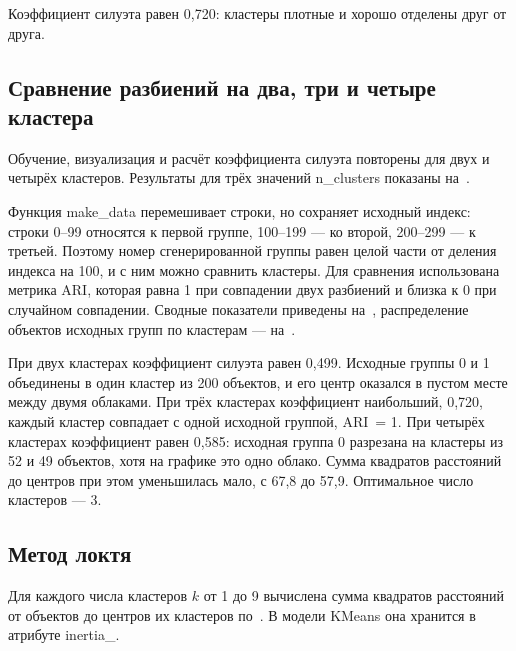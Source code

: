 \documentclass[a4paper,14pt]{extarticle}
\begin{document}

Коэффициент силуэта равен 0,720: кластеры плотные и хорошо отделены друг от друга.

\subsection{Сравнение разбиений на два, три и четыре кластера}

Обучение, визуализация и расчёт коэффициента силуэта повторены для двух и четырёх кластеров. Результаты для трёх значений n\_clusters показаны на~.


Функция make\_data перемешивает строки, но сохраняет исходный индекс: строки 0–99 относятся к первой группе, 100–199 — ко второй, 200–299 — к третьей. Поэтому номер сгенерированной группы равен целой части от деления индекса на 100, и с ним можно сравнить кластеры. Для сравнения использована метрика ARI, которая равна 1 при совпадении двух разбиений и близка к 0 при случайном совпадении. Сводные показатели приведены на~, распределение объектов исходных групп по кластерам — на~.



При двух кластерах коэффициент силуэта равен 0,499. Исходные группы 0 и 1 объединены в один кластер из 200 объектов, и его центр оказался в пустом месте между двумя облаками. При трёх кластерах коэффициент наибольший, 0,720, каждый кластер совпадает с одной исходной группой, ARI~= 1. При четырёх кластерах коэффициент равен 0,585: исходная группа 0 разрезана на кластеры из 52 и 49 объектов, хотя на графике это одно облако. Сумма квадратов расстояний до центров при этом уменьшилась мало, с 67,8 до 57,9. Оптимальное число кластеров — 3.

\subsection{Метод локтя}

Для каждого числа кластеров $k$ от 1 до 9 вычислена сумма квадратов расстояний от объектов до центров их кластеров по~. В модели KMeans она хранится в атрибуте inertia\_.
\end{document}
